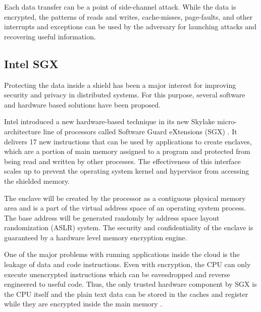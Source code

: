 Each data transfer can be a point of side-channel attack. While the data is encrypted, the patterns of reads and writes, cache-misses, page-faults, and other interrupts and exceptions can be used by the adversary for launching attacks and recovering useful information.

\subsection{Intel SGX}

Protecting the data inside a shield has been a major interest for improving security and privacy in distributed systems. For this purpose, several software and hardware based solutions have been proposed.

Intel introduced a new hardware-based technique in its new Skylake micro-architecture \cite{skylake} line of processors called Software Guard eXtensions (SGX) \cite{sgx}. It delivers 17 new instructions that can be used by applications to create enclaves, which are a portion of main memory assigned to a program and protected from being read and written by other processes. The effectiveness of this interface scales up to prevent the operating system kernel and hypervisor from accessing the shielded memory.

The enclave will be created by the processor as a contiguous physical memory area and is a part of the virtual address space of an operating system process. The base address will be generated randomly by address space layout randomization (ASLR) system. The security and confidentiality of the enclave is guaranteed by a hardware level memory encryption engine.

One of the major problems with running applications inside the cloud is the leakage of data and code instructions. Even with encryption, the CPU can only execute unencrypted instructions which can be eavesdropped and reverse engineered to useful code. Thus, the only trusted hardware component by SGX is the CPU itself and the plain text data can be stored in the caches and register while they are encrypted inside the main memory \cite{brasser2017software}.

